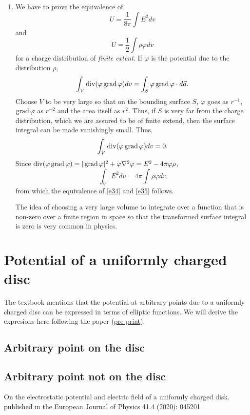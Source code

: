 \documentclass{article}
\begin{document}
\begin{enumerate}
\item We have to prove the equivalence of
\begin{equation}\label{e34}
U = \frac{1}{8\pi}\int E^2 dv
\end{equation}
and
\begin{equation}\label{e35}
U = \frac{1}{2}\int\rho\varphi dv
\end{equation}
for a charge distribution of \emph{finite extent}. If $\varphi$ is the potential
due to the distribution $\rho$,
\[
\int_V \operatorname{div}(\varphi\operatorname{grad}\varphi)dv = \int_S \varphi\operatorname{grad}\varphi\cdot d\vec{a}.
\]
Choose $V$ to be very large so that on the bounding surface $S$, $\varphi$ goes
as $r^{-1}$, $\operatorname{grad}\varphi$ as $r^{-2}$ and the area itself as $r^2$. Thus, if $S$
is very far from the charge distribution, which we are assured to be of finite
extend, then the surface integral can be made vanishingly small. Thus,
\[
\int_V \operatorname{div}(\varphi\operatorname{grad}\varphi)dv = 0.
\]
Since $\operatorname{div}(\varphi\operatorname{grad}\varphi) = |\operatorname{grad}\varphi|^2 + \varphi\nabla^2\varphi =
E^2 - 4\pi\varphi\rho$,
\[
\int_V E^2 dv = 4\pi\int\rho\varphi dv
\]
from which the equivalence of \eqref{e34} and \eqref{e35} follows.

The idea of choosing a very large volume to integrate over a function that is
non-zero over a finite region in space so that the transformed surface integral
is zero is very common in physics.
\end{enumerate}

\section{Potential of a uniformly charged disc}
The textbook mentions that the potential at arbitrary points due to a uniformly
charged disc can be expressed in terms of elliptic functions. We will derive the
expresions here following the paper (\href{https://arxiv.org/pdf/2004.04540}{pre-print})\cite{bs}.
\subsection{Arbitrary point on the disc}
\subsection{Arbitrary point not on the disc}

\begin{thebibliography}{1}
 On the electrostatic potential and electric field of a uniformly charged disk.
published in the European Journal of Physics 41.4 (2020): 045201
\end{thebibliography}
\end{document}
